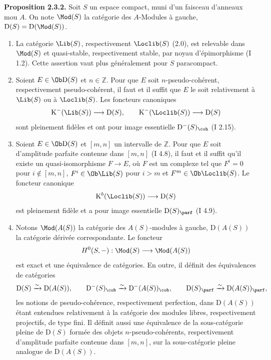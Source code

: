 \documentclass[11pt]{article}
\begin{document}
\textbf{Proposition 2.3.2.} Soit $S$ un espace compact, muni d'un faisceau d'anneaux mou $A$. On note $\Mod(S)$ la catégorie des $A$-Modules à gauche, $\mathrm D(S)=\mathrm D(\Mod(S))$.
\begin{enumerate}[label=\alph*)]
\item La catégorie $\Lib(S)$, respectivement $\Loclib(S)$ (2.0), est relevable dans $\Mod(S)$ et quasi-stable, respectivement stable, par noyau d'épimorphisme (I 1.2). Cette assertion vaut plus généralement pour $S$ paracompact.
\item Soient $E\in\Ob\mathrm D(S)$ et $n\in\mathbb Z$. Pour que $E$ soit $n$-pseudo-cohérent, respectivement pseudo-cohérent, il faut et il suffit que $E$ le soit relativement à $\Lib(S)$ ou à $\Loclib(S)$. Les foncteurs canoniques
\[
\mathrm K^{-}(\Lib(S))\longrightarrow \mathrm D(S),
\qquad
\mathrm K^{-}(\Loclib(S))\longrightarrow \mathrm D(S)
\]
sont pleinement fidèles et ont pour image essentielle $\mathrm D^{-}(S)_{\coh}$ (I 2.15).
\item Soient $E\in\Ob\mathrm D(S)$ et $[m,n]$ un intervalle de $\mathbb Z$. Pour que $E$ soit d'amplitude parfaite contenue dans $[m,n]$ (I 4.8), il faut et il suffit qu'il existe un quasi-isomorphisme $F\to E$, où $F$ est un complexe tel que $F^i=0$ pour $i\notin[m,n]$, $F^i\in\Ob\Lib(S)$ pour $i>m$ et $F^m\in\Ob\Loclib(S)$. Le foncteur canonique
\[
\mathrm K^b(\Loclib(S))\longrightarrow\mathrm D(S)
\]
est pleinement fidèle et a pour image essentielle $\mathrm D(S)_{\parf}$ (I 4.9).
\item Notons $\Mod(A(S))$ la catégorie des $A(S)$-modules à gauche, $\mathrm D(A(S))$ la catégorie dérivée correspondante. Le foncteur
\[
H^0(S,-):\Mod(S)\longrightarrow\Mod(A(S))
\]
est exact et une équivalence de catégories. En outre, il définit des équivalences de catégories
\[
\mathrm D(S)\xrightarrow{\sim}\mathrm D(A(S)),\qquad
\mathrm D^{-}(S)_{\coh}\xrightarrow{\sim}\mathrm D^{-}(A(S))_{\coh},\qquad
\mathrm D(S)_{\parf}\xrightarrow{\sim}\mathrm D(A(S))_{\parf},
\]
les notions de pseudo-cohérence, respectivement perfection, dans $\mathrm D(A(S))$ étant entendues relativement à la catégorie des modules libres, respectivement projectifs, de type fini. Il définit aussi une équivalence de la sous-catégorie pleine de $\mathrm D(S)$ formée des objets $n$-pseudo-cohérents, respectivement d'amplitude parfaite contenue dans $[m,n]$, sur la sous-catégorie pleine analogue de $\mathrm D(A(S))$.
\end{enumerate}
\end{document}
